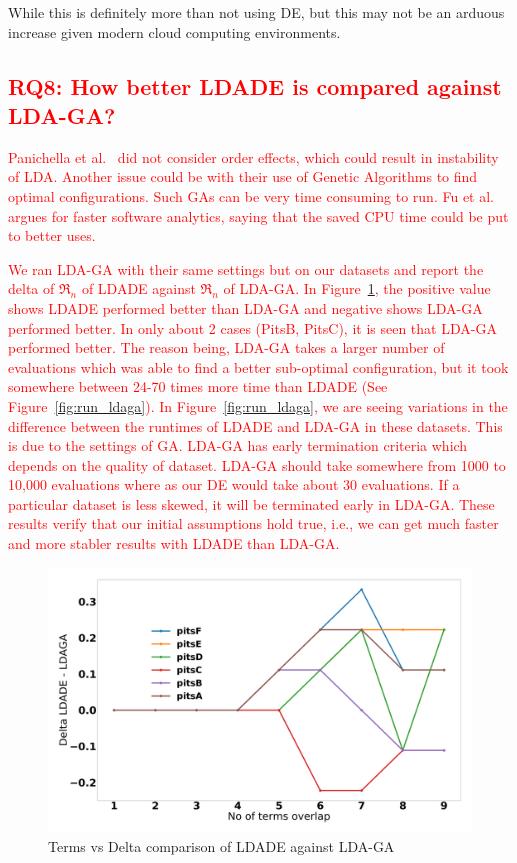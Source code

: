\documentclass[twocolumn,5p,sort&compress]{elsarticle}
\theoremstyle{break}
\begin{document}
  While this is definitely more than not using DE, but this may not be an arduous increase
  given modern cloud computing environments.

\subsection{\textcolor{red}{\textbf{RQ8: How better LDADE is compared against LDA-GA?}}}
\label{sect:rq8}

\textcolor{red}{Panichella et al.~\cite{panichella2013effectively} did not consider order effects, which could result in instability of LDA. 
Another issue could be with their use of Genetic Algorithms to find optimal configurations. Such GAs can be very time consuming to run.
 Fu et al.~\cite{fu2017easy} argues for faster software analytics,
 saying that the saved CPU time
 could be put to better uses.}

\textcolor{red}{We ran LDA-GA with their same settings but on our datasets and report the delta of $\Re_n$ of LDADE against $\Re_n$ of LDA-GA. In Figure~\ref{fig:ldaga}, the positive value shows LDADE performed better than LDA-GA and negative shows LDA-GA performed better. In only about 2 cases (PitsB, PitsC), it is seen that LDA-GA performed better. The reason being, LDA-GA takes a larger number of evaluations which was able to find a better sub-optimal configuration, but it took somewhere between 24-70 times more time than LDADE (See Figure~\ref{fig:run_ldaga}). In Figure~\ref{fig:run_ldaga}, we are seeing variations in the difference between the runtimes of LDADE and LDA-GA in these datasets. This is due to the settings of GA. LDA-GA has early termination criteria which depends on the quality of dataset. LDA-GA should take somewhere from 1000 to 10,000 evaluations where as our DE would take about 30 evaluations. If a particular dataset is less skewed, it will be terminated early in LDA-GA. These results verify that our initial assumptions hold true, i.e., we can get much faster and more stabler results with LDADE than LDA-GA.}

\begin{figure}[!t]
  \includegraphics[width=\linewidth]{./fig/ldaga.png}
  \caption{Terms vs Delta comparison of LDADE against LDA-GA}
  \label{fig:ldaga}
\end{figure}
\end{document}
